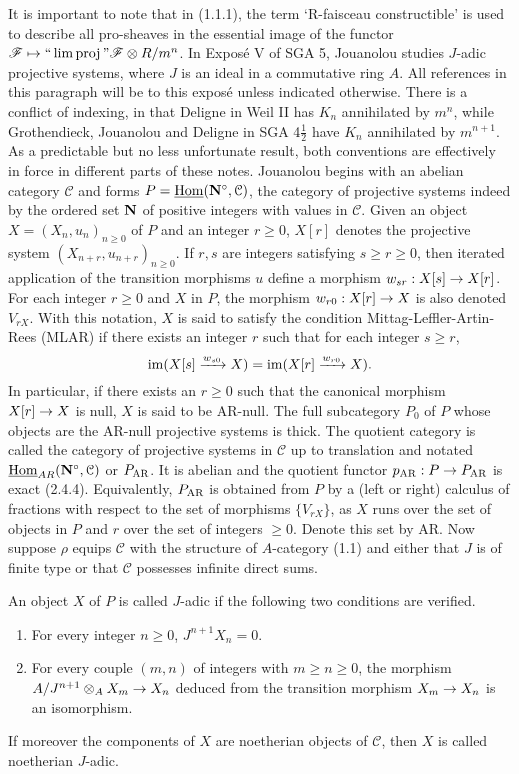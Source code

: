 \documentclass[deligne.tex]{subfiles}
\begin{document}
It is important to note that in (1.1.1), the term 
`R-faisceau constructible' is used to describe all pro-sheaves in the 
essential image of the functor
$\mathscr F\mapsto``\lim\operatorname{proj}" \mathscr F\otimes R/m^n$.
In Exposé V of SGA 5, Jouanolou studies $J$-adic projective systems, where
$J$ is an ideal in a commutative ring $A$. All references in this paragraph
will be to this exposé unless indicated otherwise.
There is a conflict of indexing, in that Deligne in Weil II has
$K_n$ annihilated by $m^n$, while Grothendieck, Jouanolou and Deligne in
SGA 4$\frac12$ have $K_n$ annihilated by $m^{n+1}$.
As a predictable but no less unfortunate result, both conventions are
effectively in force in different parts of these notes.
Jouanolou begins with an abelian category $\mathcal C$ and forms
$P=\underline{\operatorname{Hom}}(\mathbf{N}^\circ,\mathcal C)$, the
category of projective systems indeed by the ordered set $\mathbf{N}$ of positive
integers with values in $\mathcal C$.
Given an object $X=(X_n,u_n)_{n\geq0}$ of $P$ and an integer $r\geq0$,
$X[r]$ denotes the projective system $(X_{n+r},u_{n+r})_{n\geq0}$.
If $r,s$ are integers satisfying $s\geq r\geq0$, then iterated application
of the transition morphisms $u$ define a morphism $w_{sr}:X[s]\rightarrow X[r]$.
For each integer $r\geq0$ and $X$ in $P$, the morphism $w_{r0}:X[r]\rightarrow X$
is also denoted $V_{rX}$.
With this notation, $X$ is said to satisfy the condition
Mittag-Leffler-Artin-Rees (MLAR) if there exists an integer $r$ such that
for each integer $s\geq r$,
\begin{equation*}
	\operatorname{im}(X[s]\xrightarrow{w_{s0}}X)=\operatorname{im}(X[r]\xrightarrow{w_{r0}}X).
\end{equation*}
In particular, if there exists an $r\geq0$ such that the canonical morphism
$X[r]\rightarrow X$ is null, $X$ is said to be AR-null.
The full subcategory $P_0$ of $P$ whose objects are the AR-null projective
systems is thick. The quotient category is called the category of
projective systems in $\mathcal C$ up to translation and notated
$\underline{\operatorname{Hom}}_{AR}(\mathbf{N}^\circ,\mathcal C)$ or $P_{\mathrm{AR}}$. It is abelian and
the quotient functor $p_{\mathrm{AR}}:P\rightarrow P_{\mathrm{AR}}$ is exact (2.4.4).
Equivalently, $P_{\mathrm{AR}}$ is obtained from $P$ by a (left or right) calculus of
fractions with respect to the set of morphisms $\{V_{rX}\}$, as $X$ runs
over the set of objects in $P$ and $r$ over the set of integers $\geq0$.
Denote this set by AR.
Now suppose $\rho$ equips $\mathcal C$ with the structure of $A$-category
(1.1) and either that $J$ is of finite type or that $\mathcal C$ possesses
infinite direct sums.
\begin{definition*}[3.1.1]
	An object $X$ of $P$ is called $J$-adic if the following two conditions
	are verified.
	\begin{enumerate}[label=(\roman*)]
	\item 	For every integer $n\geq0$, $J^{n+1}X_n=0$.
	\item For every couple $(m,n)$ of integers with $m\geq n\geq0$, the
morphism  $A/J^{n+1}\otimes_AX_m\rightarrow X_n$ deduced from the transition
morphism $X_m\rightarrow X_n$ is an isomorphism. 
	\end{enumerate}
	If moreover the components of $X$ are noetherian objects of
	$\mathcal C$, then $X$ is called noetherian $J$-adic.
\end{definition*}
\end{document}
